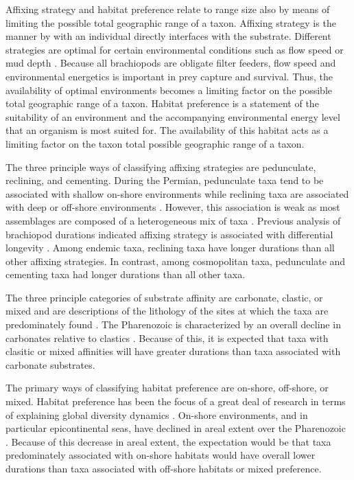 \documentclass[12pt,letterpaper]{article}
\begin{document}
Affixing strategy and habitat preference relate to range size also by means of limiting the possible total geographic range of a taxon. Affixing strategy is the manner by with an individual directly interfaces with the substrate. Different strategies are optimal for certain environmental conditions such as flow speed or mud depth \citep{Alexander1977,LaBarbera1978,LaBarbera1981}. Because all brachiopods are obligate filter feeders, flow speed and environmental energetics is important in prey capture and survival. Thus, the availability of optimal environments becomes a limiting factor on the possible total geographic range of a taxon. Habitat preference is a statement of the suitability of an environment and the accompanying environmental energy level that an organism is most suited for. The availability of this habitat acts as a limiting factor on the taxon total possible geographic range of a taxon. 

The three principle ways of classifying affixing strategies are pedunculate, reclining, and cementing. During the Permian, pedunculate taxa tend to be associated with shallow on-shore environments while reclining taxa are associated with deep or off-shore environments \citep{Clapham2007}. However, this association is weak as most assemblages are composed of a heterogeneous mix of taxa \citep{Clapham2007}. Previous analysis of brachiopod durations indicated affixing strategy is associated with differential longevity \citep{Alexander1977}. Among endemic taxa, reclining taxa have longer durations than all other affixing strategies. In contrast, among cosmopolitan taxa, pedunculate and cementing taxa had longer durations than all other taxa. 

The three principle categories of substrate affinity are carbonate, clastic, or mixed and are descriptions of the lithology of the sites at which the taxa are predominately found \citep{Foote2006,Anderson2011a,Nurnberg2013a,Kiessling2007a,Miller2001}. The Pharenozoic is characterized by an overall decline in carbonates relative to clastics \citep{Foote2006,Miller2001}. Because of this, it is expected that taxa with clasitic or mixed affinities will have greater durations than taxa associated with carbonate substrates. %

The primary ways of classifying habitat preference are on-shore, off-shore, or mixed. Habitat preference has been the focus of a great deal of research in terms of explaining global diversity dynamics \citep{Sepkoski1991}. On-shore environments, and in particular epicontinental seas, have declined in areal extent over the Pharenozoic \citep{Peters2008}. Because of this decrease in areal extent, the expectation would be that taxa predominately associated with on-shore habitats would have overall lower durations than taxa associated with off-shore habitats or mixed preference.
\end{document}
